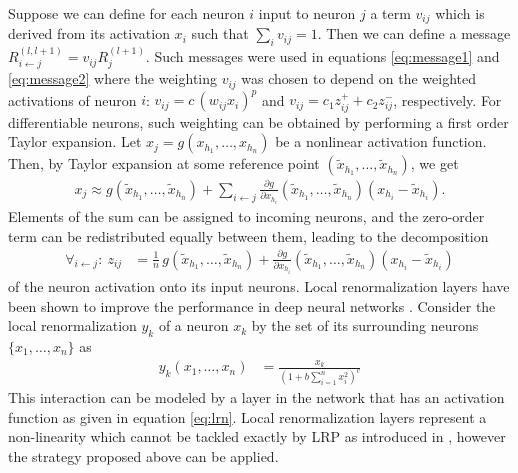 \documentclass[runningheads,a4paper]{llncs}
\begin{document}
Suppose we can define for each neuron $i$ input to neuron $j$ a term $v_{ij}$ which is derived from its activation $x_i$ such that $\sum_i v_{ij}=1$. Then we can define a message $R^{(l,l+1)}_{i \leftarrow j} = v_{ij} R^{(l+1)}_j \label{eq:vijbasic}$. Such messages were used in equations \ref{eq:message1} and \ref{eq:message2} where the weighting $v_{ij}$ was chosen to depend on the weighted activations of neuron $i$: $v_{ij} = c \, (w_{ij} x_i )^p$ and $v_{ij} = c_1 z_{ij}^{+}+c_2 z_{ij}^{-}$, respectively. For differentiable neurons, such weighting can be obtained by performing a first order Taylor expansion. Let $x_j = g ( x_{h_1}, \ldots, x_{h_n})$ be a nonlinear activation function. Then, by Taylor expansion at some reference point $( \widetilde{x}_{h_1}, \ldots, \widetilde{x}_{h_n}  )$, we get
\begin{align}
x_j \approx g( \widetilde{x}_{h_1}, \ldots, \widetilde{x}_{h_n}  ) + \sum_{i \leftarrow j}\frac{\partial g} {\partial x_{h_i}}( \widetilde{x}_{h_1}, \ldots, \widetilde{x}_{h_n}  ) (x_{h_i}-\widetilde{x}_{h_i}).
\end{align}
Elements of the sum can be assigned to incoming neurons, and the zero-order term can be redistributed equally between them, leading to the decomposition
\begin{align}
\forall_{i \leftarrow j}:~ z_{ij}& =  \frac1n \,g( \widetilde{x}_{h_1}, \ldots, \widetilde{x}_{h_n}  ) + \frac{\partial g} {\partial x_{h_i}}( \widetilde{x}_{h_1}, \ldots, \widetilde{x}_{h_n}  ) (x_{h_i}-\widetilde{x}_{h_i}) \label{eq:vijdefinition}
\end{align}
of the neuron activation onto its input neurons. Local renormalization layers have been shown to improve the performance in deep neural networks \cite{DBLP:conf/nips/KrizhevskySH12}. Consider the local renormalization $y_k$ of a neuron $x_k$ by the set of its surrounding neurons $\{x_1, \ldots, x_n\}$ as 
\begin{align}
y_k(x_1, \ldots, x_n) & = \frac{x_k}{  \left(1+ b \sum_{i=1}^n x_i^2 \right)^c } \label{eq:lrn}
\end{align}
This interaction can be modeled by a layer in the network that has an activation function as given in equation \ref{eq:lrn}. Local renormalization layers represent a non-linearity which cannot be tackled exactly by LRP as introduced in \cite{BacBinMonKlaMueSam15}, however the strategy proposed above can be applied. 
\end{document}
